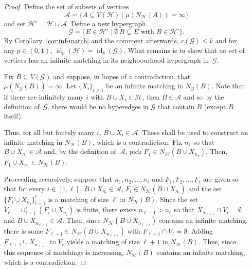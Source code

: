 \documentclass[11pt,reqno]{amsart}
\theoremstyle{definition}
\begin{document}
\begin{proof}
Define the set of subsets of vertices
\[
\mathcal{A} = \{A \subseteq V(\mathcal{H}) \mid \mu(N_{\mathcal{H}}(A)) = \infty\}
\]
and set $\mathcal{H}' = \mathcal{H} \cup \mathcal{A}$.  Define a new hypergraph
\[
\mathcal{G} = \{E \in \mathcal{H}' \mid \nexists\ B \subsetneq E \text{ with } B \in \mathcal{H}'\}.
\]
By Corollary~\ref{cor:inf-match} and the comment afterwards, $r(\mathcal{G}) \leq k$ and for any $p \in (0,1)$, ${\operatorname{id}}_p(\mathcal{H}) = {\operatorname{id}}_p(\mathcal{G})$. What remains is to show that no set of vertices has an infinite matching in its neighbourhood hypergraph in~$\mathcal{G}$.

Fix $B \subseteq V(\mathcal{G})$ and suppose, in hopes of a contradiction, that $\mu(N_{\mathcal{G}}(B)) = \infty$. Let $\{X_i\}_{i \geq 1}$ be an infinite matching in $N_{\mathcal{G}}(B)$.  Note that if there are infinitely many $i$ with $B\cup X_i \in \mathcal{H}$, then $B \in \mathcal{A}$ and so by the definition of~$\mathcal{G}$, there would be no hyperedges in $\mathcal{G}$ that contain $B$ (except $B$ itself).

Thus, for all but finitely many $i$, $B\cup X_i \in \mathcal{A}$. These shall be used to construct an infinite matching in $N_{\mathcal{H}}(B)$, which is a contradiction. Fix $n_1$ so that $B \cup X_{n_1} \in \mathcal{A}$ and, by the definition of~$\mathcal{A}$, pick $F_{1} \in N_{\mathcal{H}}(B\cup X_{n_1})$.  Then, $F_{1} \cup X_{n_1} \in N_{\mathcal{H}}(B)$.

Proceeding recursively, suppose that $n_1, n_2, \dots, n_\ell$ and $F_1, F_2, \dots, F_\ell$ are given so that for every $i \in [1, \ell]$, $B\cup X_{n_i} \in \mathcal{A}$, $F_i \in N_{\mathcal{H}}(B\cup X_{n_i})$ and the set $\{F_i \cup X_{n_i}\}_{i = 1}^{\ell}$ is a matching of size $\ell$ in $N_{\mathcal{H}}(B)$. Since the set $V_\ell = \cup_{i = 1}^{\ell} (F_i \cup X_{n_i})$ is finite, there exists $n_{\ell+1} > n_{\ell}$ so that $X_{n_{\ell+1}} \cap V_\ell = \emptyset$ and $B\cup X_{n_{\ell+1}}\in \mathcal{A}$. Then, since $N_{\mathcal{H}}(B\cup X_{n_{\ell+1}})$ contains an infinite matching, there is some $F_{\ell+1} \in N_{\mathcal{H}}(B\cup X_{n_{\ell+1}})$ with $F_{\ell+1} \cap V_\ell = \emptyset$.  Adding $F_{\ell+1}\cup X_{n_{\ell+1}}$ to $V_\ell$ yields a matching of size $\ell+1$ in $N_{\mathcal{H}}(B)$.  Thus, since this sequence of matchings is increasing, $N_{\mathcal{H}}(B)$ contains an infinite matching, which is a contradiction.
\end{proof}
\end{document}
